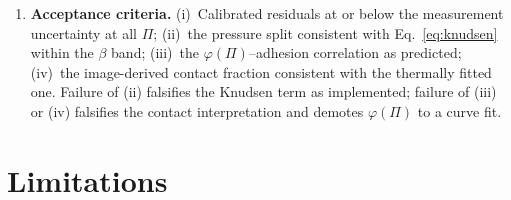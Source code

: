 \documentclass[10pt,a4paper]{article}
\begin{document}
\begin{enumerate}
\item \textbf{Acceptance criteria.} (i)~Calibrated residuals at or below the measurement uncertainty at all $\Pi$; (ii)~the pressure split consistent with Eq.~\eqref{eq:knudsen} within the $\beta$ band; (iii)~the $\varphi(\Pi)$--adhesion correlation as predicted; (iv)~the image-derived contact fraction consistent with the thermally fitted one. Failure of (ii) falsifies the Knudsen term as implemented; failure of (iii) or (iv) falsifies the contact interpretation and demotes $\varphi(\Pi)$ to a curve fit.
\end{enumerate}

\section{Limitations}
\label{sec:limitations}
\end{document}
